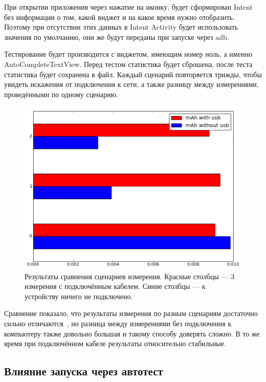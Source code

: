 \documentclass[a4paper,14pt]{extarticle} %
\begin{document}
	При открытии приложения через нажатие на иконку, будет сформирован Intent без информации о том, какой виджет и на какое время нужно отобразить. Поэтому при отсутствии этих данных в Intent Activity будет использовать значения по умолчанию, они же будут переданы при запуске через adb.
	
	Тестирование будет производится с виджетом, имеющим номер ноль, а именно AutoCompleteTextView. Перед тестом статистика будет сброшена, после теста статистика будет сохранена в файл. Каждый сценарий повторяется трижды, чтобы увидеть искажения от подключения к сети, а также разницу между измерениями, проведёнными по одному сценарию.
	
	\begin{figure}[H]
		\includegraphics[width=\textwidth]{usb_comparation}
		\caption{Результаты сравнения сценариев измерения. Красные столбцы --- 3 измерения с подключённым кабелем. Синие столбцы --- к устройству ничего не подключено.}
		\label{fig:usb_comparation}
	\end{figure}

	Сравнение показало, что результаты измерения по разным сценариям достаточно сильно отличаются~\ris{\ref{fig:usb_comparation}}, но разница между измерениями без подключения к компьютеру также довольно большая и такому способу доверять сложно. В то же время при подключённом кабеле результаты относительно стабильные.
	
	\subsection{Влияние запуска через автотест} \label{sub:test_act}
	
\end{document}
